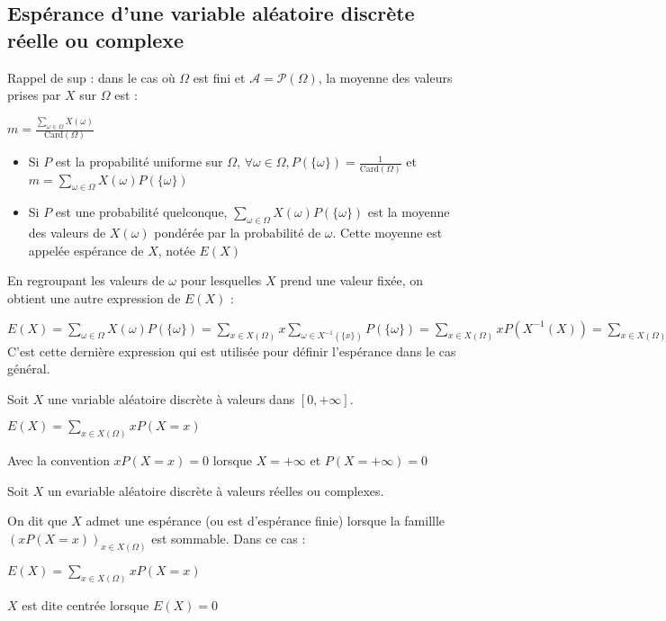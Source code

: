 \documentclass[a4paper,12pt]{book}
\newcommand{\Def}[2]{\begin{tcolorbox}[sharp corners, colback=white,colframe=blue!90!black!75, title=Définition : #1]#2\end{tcolorbox}}
\begin{document}
\subsection{Espérance d'une variable aléatoire discrète réelle ou complexe}
Rappel de sup : dans le cas où $\Omega$ est fini et $\mathcal{A}=\mathcal{P}(\Omega)$, la moyenne des valeurs prises par $X$ sur $\Omega$ est :
\par\begin{center}$m=\frac{\sum\limits_{\omega\in\Omega}X(\omega)}{\mathrm{Card}(\Omega)}$\end{center}
\begin{itemize}
\item Si $P$ est la propabilité uniforme sur $\Omega$, $\forall\omega\in\Omega, P(\{\omega\})=\frac{1}{\mathrm{Card}(\Omega)}$ et $m = \sum\limits_{\omega\in\Omega}X(\omega)P(\{\omega\})$
\item Si $P$ est une probabilité quelconque, $\sum\limits_{\omega\in\Omega}X(\omega)P(\{\omega\})$ est la moyenne des valeurs de $X(\omega)$ pondérée par la probabilité de $\omega$. Cette moyenne est appelée espérance de $X$, notée $E(X)$
\end{itemize}
En regroupant les valeurs de $\omega$ pour lesquelles $X$ prend une valeur fixée, on obtient une autre expression de $E(X)$ :
\par $E(X) =\sum\limits_{\omega\in\Omega}X(\omega)P(\{\omega\}) = \sum\limits_{x\in X(\Omega)} x\sum\limits_{\omega\in X^{-1}(\{x\})}P(\{\omega\}) = \sum\limits_{x\in X(\Omega)}xP(X^{-1}(X))=\sum\limits_{x\in X(\Omega)}xP(X=x)$
C'est cette dernière expression qui est utilisée pour définir l'espérance dans le cas général.
\Def{}{Soit $X$ une variable aléatoire discrète à valeurs dans $[0, +\infty]$.
\par\begin{center}$E(X)=\sum\limits_{x\in X(\Omega)}xP(X=x)$\end{center}
\par Avec la convention $xP(X=x)=0$ lorsque $X=+\infty$ et $P(X=+\infty)=0$}
\Def{}{Soit $X$ un evariable aléatoire discrète à valeurs réelles ou complexes.
\par On dit que $X$ admet une espérance (ou est d'espérance finie) lorsque la famillle $(xP(X=x))_{x\in X(\Omega)}$ est sommable. Dans ce cas :
\par\begin{center} $E(X)=\sum\limits_{x\in X(\Omega)}xP(X=x)$\end{center}
\par $X$ est dite centrée lorsque $E(X)=0$}
\end{document}
